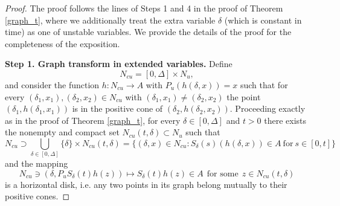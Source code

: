 \documentclass[11pt, leqno]{amsart}
\theoremstyle{definition}
\begin{document}
\begin{proof}
	The proof follows the lines of Steps 1 and 4 in the proof of Theorem \ref{graph_t}, where we additionally treat the extra variable $\delta$ (which is  constant in time) as one of unstable variables. We provide the details of the proof for the completeness of the exposition.
	
	\textbf{Step 1. Graph transform in extended variables.}
	Define
	$$
	N_{cu}=  [0,\Delta] \times N_u,
	$$
	and consider the function $h:N_{cu} \to A$ with $P_u(h(\delta,x)) = x$ such that for every $(\delta_1,x_1), (\delta_2,x_2)\in N_{cu}$ with $(\delta_1,x_1)\neq (\delta_2,x_2)$ the point $(\delta_1,h(\delta_1,x_1))$ is in the positive cone of $(\delta_2,h(\delta_2,x_2))$. Proceeding exactly as in the proof of Theorem \ref{graph_t}, for every $\delta\in [0,\Delta]$ and $t>0$ there exists the nonempty and compact set $N_{cu}(t,\delta) \subset N_u$ such that
	$$
	N_{cu} \supset \bigcup_{\delta\in [0,\Delta]}\{\delta\}\times N_{cu}(t,\delta) = \{ (\delta,x) \in N_{cu} :  S_\delta(s)(h(\delta,x)) \in A \ \mathrm{for}\ s\in [0,t]\}
	$$ and the mapping
	$$
	N_{cu} \ni (\delta,P_u S_\delta(t)h(z))  \mapsto S_\delta(t)h(z) \in A\ \ \textrm{for some}\ \ z\in N_{cu}(t,\delta)
	$$
	is a horizontal disk, i.e. any two points in its graph belong mutually to their positive cones.
	

\end{proof}
\end{document}
